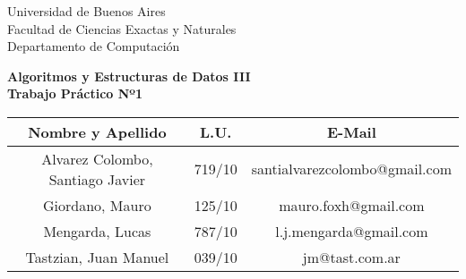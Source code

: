 \begin{titlepage}
\begin{center}
\vspace{4cm}

\textnormal{Universidad de Buenos Aires}\\
\textnormal{Facultad de Ciencias Exactas y Naturales}\\
\textnormal{Departamento de Computación}\\

\vspace{5cm}

\large\textbf{Algoritmos y Estructuras de Datos III} \\
\textbf{Trabajo Práctico Nº1} \\

\vspace{7.5cm}

\begin{tabular}{|c |c |c |} \hline
	\textbf{Nombre y Apellido} & \textbf{L.U.} & \textbf{E-Mail} \\ \hline
	Alvarez Colombo, Santiago Javier & 719/10 & santialvarezcolombo@gmail.com \\ \hline
	Giordano, Mauro & 125/10 & mauro.foxh@gmail.com \\ \hline
	Mengarda, Lucas & 787/10 & l.j.mengarda@gmail.com \\ \hline
	Tastzian, Juan Manuel & 039/10 & jm@tast.com.ar \\ \hline
\end{tabular}

\vspace{4cm}

\vspace{2cm}


\end{center}
\end{titlepage}
